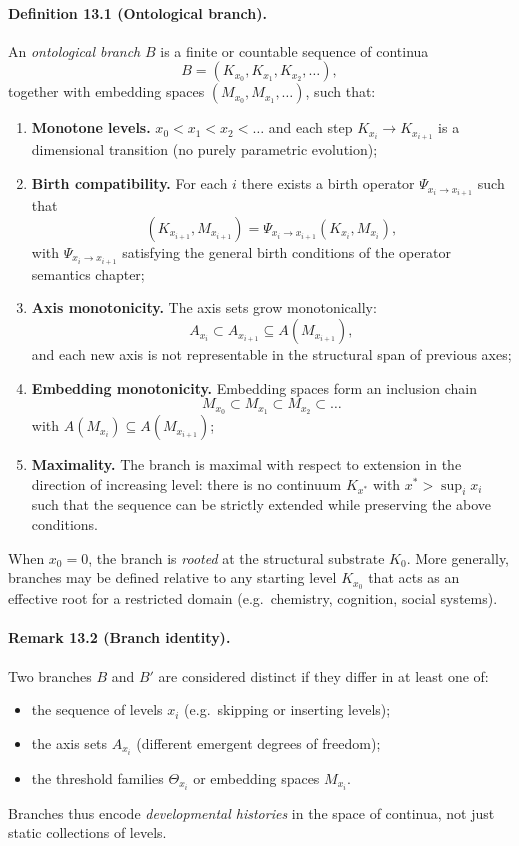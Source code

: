 \paragraph{Definition 13.1 (Ontological branch).}
An \emph{ontological branch} \(B\) is a finite or countable sequence of continua
\[
  B = (K_{x_0}, K_{x_1}, K_{x_2}, \dots),
\]
together with embedding spaces \((M_{x_0}, M_{x_1}, \dots)\), such that:
\begin{enumerate}
  \item \textbf{Monotone levels.}\quad
        \(x_0 < x_1 < x_2 < \dots\) and each step
        \(K_{x_i} \to K_{x_{i+1}}\) is a dimensional transition
        (no purely parametric evolution);
  \item \textbf{Birth compatibility.}\quad
        For each \(i\) there exists a birth operator
        \(\Psi_{x_i\to x_{i+1}}\) such that
        \[
          (K_{x_{i+1}}, M_{x_{i+1}}) =
            \Psi_{x_i\to x_{i+1}}(K_{x_i}, M_{x_i}),
        \]
        with \(\Psi_{x_i\to x_{i+1}}\) satisfying the general birth
        conditions of the operator semantics chapter;
  \item \textbf{Axis monotonicity.}\quad
        The axis sets grow monotonically:
        \[
          A_{x_i} \subset A_{x_{i+1}}
          \subseteq A(M_{x_{i+1}}),
        \]
        and each new axis is not representable in the structural span of
        previous axes;
  \item \textbf{Embedding monotonicity.}\quad
        Embedding spaces form an inclusion chain
        \[
          M_{x_0} \subset M_{x_1} \subset M_{x_2} \subset \dots
        \]
        with \(A(M_{x_i}) \subseteq A(M_{x_{i+1}})\);
  \item \textbf{Maximality.}\quad
        The branch is maximal with respect to extension in the direction
        of increasing level: there is no continuum \(K_{x^{\ast}}\) with
        \(x^{\ast} > \sup_i x_i\) such that the sequence can be strictly
        extended while preserving the above conditions.
\end{enumerate}

When \(x_0 = 0\), the branch is \emph{rooted} at the structural substrate
\(K_0\). More generally, branches may be defined relative to any starting level
\(K_{x_0}\) that acts as an effective root for a restricted domain
(e.g.\ chemistry, cognition, social systems).

\paragraph{Remark 13.2 (Branch identity).}
Two branches \(B\) and \(B'\) are considered distinct if they differ in at
least one of:
\begin{itemize}
  \item the sequence of levels \(x_i\) (e.g.\ skipping or inserting levels);
  \item the axis sets \(A_{x_i}\) (different emergent degrees of freedom);
  \item the threshold families \(\Theta_{x_i}\) or embedding spaces \(M_{x_i}\).
\end{itemize}
Branches thus encode \emph{developmental histories} in the space of continua,
not just static collections of levels.

